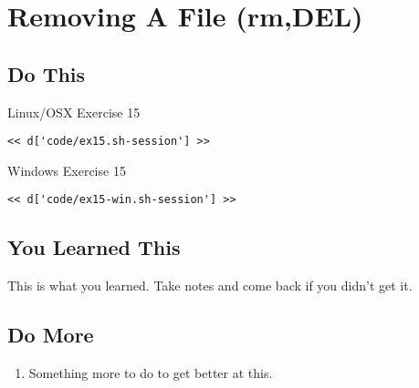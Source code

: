 \chapter{Removing A File (rm,DEL)}

\section{Do This}

\begin{code}{Linux/OSX Exercise 15}
\begin{Verbatim}
<< d['code/ex15.sh-session'] >>
\end{Verbatim}
\end{code}

\begin{code}{Windows Exercise 15}
\begin{Verbatim}
<< d['code/ex15-win.sh-session'] >>
\end{Verbatim}
\end{code}

\section{You Learned This}

This is what you learned.  Take notes and come back if you didn't get it.

\section{Do More}

\begin{enumerate}
\item Something more to do to get better at this.
\end{enumerate}

